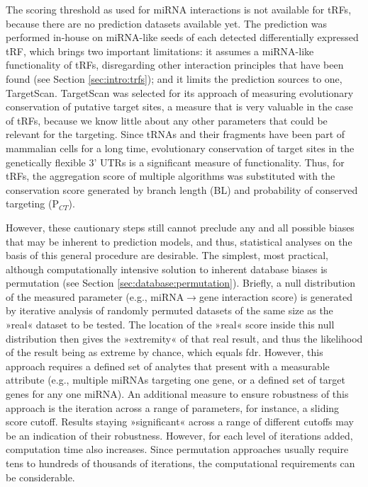 The scoring threshold as used for miRNA interactions is not available for tRFs, because there are no prediction datasets available yet. The prediction was performed in-house on miRNA-like seeds of each detected differentially expressed tRF, which brings two important limitations: it assumes a miRNA-like functionality of tRFs, disregarding other interaction principles that have been found (see Section \ref{sec:intro:trfs}); and it limits the prediction sources to one, TargetScan.\cite{Friedman2009} TargetScan was selected for its approach of measuring evolutionary conservation of putative target sites, a measure that is very valuable in the case of tRFs, because we know little about any other parameters that could be relevant for the targeting. Since tRNAs and their fragments have been part of mammalian cells for a long time, evolutionary conservation of target sites in the genetically flexible 3' UTRs is a significant measure of functionality.\cite{Agarwal2015} Thus, for tRFs, the aggregation score of multiple algorithms was substituted with the conservation score generated by branch length (BL) and probability of conserved targeting (P$_{CT}$).\cite{Agarwal2015}

However, these cautionary steps still cannot preclude any and all possible biases that may be inherent to prediction models, and thus, statistical analyses on the basis of this general procedure are desirable. The simplest, most practical, although computationally intensive solution to inherent database biases is permutation (see Section \ref{sec:database:permutation}). Briefly, a null distribution of the measured parameter (e.g., miRNA$\to$gene interaction score) is generated by iterative analysis of randomly permuted datasets of the same size as the »real« dataset to be tested. The location of the »real« score inside this null distribution then gives the »extremity« of that real result, and thus the likelihood of the result being as extreme by chance, which equals \acf{fdr}. However, this approach requires a defined set of analytes that present with a measurable attribute (e.g., multiple miRNAs targeting one gene, or a defined set of target genes for any one miRNA). An additional measure to ensure robustness of this approach is the iteration across a range of parameters, for instance, a sliding score cutoff. Results staying »significant« across a range of different cutoffs may be an indication of their robustness. However, for each level of iterations added, computation time also increases. Since permutation approaches usually require tens to hundreds of thousands of iterations, the computational requirements can be considerable.

